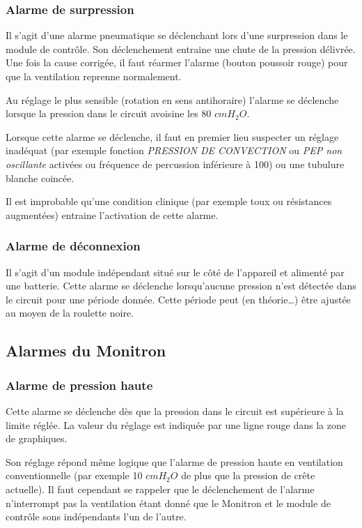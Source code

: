 \subsubsection{Alarme de surpression}

Il s'agit d'une alarme pneumatique se déclenchant lors d'une surpression
dans le module de contrôle. Son déclenchement entraine une chute de la
pression délivrée. Une fois la cause corrigée, il faut réarmer l'alarme
(bouton poussoir rouge) pour que la ventilation reprenne normalement.

Au réglage le plus sensible (rotation en sens antihoraire) l'alarme se
déclenche lorsque la pression dans le circuit avoisine les 80 $cmH_2O$.

Lorsque cette alarme se déclenche, il faut en premier lieu suspecter un
réglage inadéquat (par exemple fonction \emph{PRESSION DE CONVECTION} ou
\emph{PEP non oscillante} activées ou fréquence de percussion inférieure
à 100) ou une tubulure blanche coincée.

Il est improbable qu'une condition clinique (par exemple toux ou
résistances augmentées) entraine l'activation de cette alarme.

\subsubsection{Alarme de déconnexion}

Il s'agit d'un module indépendant situé sur le côté de l'appareil et
alimenté par une batterie. Cette alarme se déclenche lorsqu'aucune
pression n'est détectée dans le circuit pour une période donnée. Cette
période peut (en théorie\ldots{}) être ajustée au moyen de la roulette
noire.

\subsection{Alarmes du Monitron}

\subsubsection*{Alarme de pression haute}%

Cette alarme se déclenche dès que la pression dans le circuit est
supérieure à la limite réglée. La valeur du réglage est indiquée par une
ligne rouge dans la zone de graphiques.

Son réglage répond même logique que l'alarme de pression haute en
ventilation conventionnelle (par exemple 10 $cmH_2O$ de plus que la
pression de crête actuelle). Il faut cependant se rappeler que le
déclenchement de l'alarme n'interrompt pas la ventilation étant donné
que le Monitron et le module de contrôle sons indépendants l'un de
l'autre.


